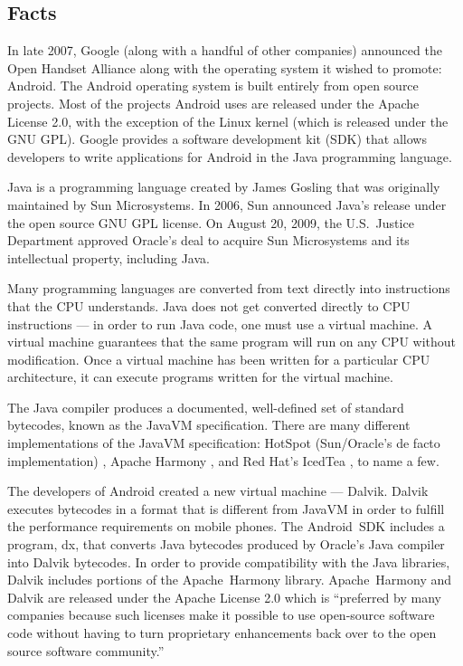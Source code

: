 \documentclass[11pt]{article}
\begin{document}
\begin{multicols}{2}
\setcounter{page}{1}

\section{Facts} %
\label{sec:facts}

In late 2007, Google (along with a handful of other companies) announced the
Open Handset Alliance \cite{open-handset-alliance-ann} along with the operating
system it wished to promote: Android.  The Android operating system is built
entirely from open source projects.  Most of the projects Android uses are
released under the Apache License 2.0, with the exception of the Linux kernel
(which is released under the GNU GPL).  Google provides a software development
kit (SDK) that allows developers to write applications for Android in the Java
programming language.

Java is a programming language created by James Gosling that was originally
maintained by Sun Microsystems.  In 2006, Sun announced Java's release under the
open source GNU GPL license. \cite{sun-open-sources-java} On August 20, 2009,
the U.S.~Justice Department approved Oracle's deal to acquire Sun Microsystems
and its intellectual property, including Java. \cite{oracle-buys-sun}

Many programming languages are converted from text directly into instructions
that the CPU understands.  Java does not get converted directly to CPU
instructions --- in order to run Java code, one must use a virtual machine.  A
virtual machine guarantees that the same program will run on any CPU without
modification.  Once a virtual machine has been written for a particular CPU
architecture, it can execute programs written for the virtual machine.

The Java compiler produces a documented, well-defined set of standard bytecodes,
known as the JavaVM specification. \cite[Chapter 4]{javavm-bytecode}  There are
many different implementations of the JavaVM specification: HotSpot
(Sun/Oracle's de facto implementation) \cite{hotspot}, Apache Harmony
\cite{apache-harmony}, and Red Hat's IcedTea \cite{icedtea}, to name a few.

The developers of Android created a new virtual machine --- Dalvik.  Dalvik
executes bytecodes in a format that is different from JavaVM in order to fulfill
the performance requirements on mobile phones.  \cite{dalvik-bytecode}
\cite{dalvik-vm-arch} The Android~SDK includes a program, dx, that converts
Java bytecodes produced by Oracle's Java compiler into Dalvik bytecodes.
\cite{android-sdk-building} In order to provide compatibility with the Java
libraries, Dalvik includes portions of the Apache~Harmony library.
\cite{apache-harmony} \cite{dalvik-readme}  Apache~Harmony and Dalvik are
released under the Apache License 2.0 \cite{apache-license} which is ``preferred
by many companies because such licenses make it possible to use open-source
software code without having to turn proprietary enhancements back over to the
open source software community.'' \cite{why-apache2-license}


\end{multicols}
\end{document}
